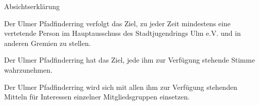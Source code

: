 \begin{legal}
\begin{legal}
        \end{legal}
    \item Absichtserklärung
        \begin{legal}
            \item Der Ulmer Pfadfinderring verfolgt das Ziel, zu jeder Zeit mindestens eine 
                  vertetende Person im Hauptausschuss des Stadtjugendrings Ulm e.V. 
                  und in anderen Gremien zu stellen.
            \item Der Ulmer Pfadfinderring hat das Ziel, jede ihm zur Verfügung stehende Stimme 
                  wahrzunehmen.
            \item Der Ulmer Pfadfinderring wird sich mit allen ihm zur Verfügung stehenden 
                  Mitteln für Interessen einzelner Mitgliedsgruppen einsetzen.
        \end{legal}
\end{legal}
